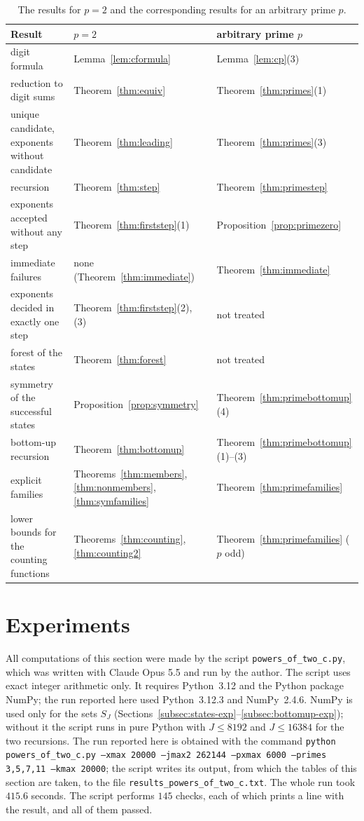 \documentclass[11pt]{amsart}
\theoremstyle{definition}
\begin{document}
\begin{table}[H]
\centering
\caption{The results for $p=2$ and the corresponding results for an arbitrary prime $p$.}
\label{tab:scope}
\begin{tabular}{lll}
\toprule
Result & $p=2$ & arbitrary prime $p$\\
\midrule
digit formula & Lemma~\ref{lem:cformula} & Lemma~\ref{lem:cp}(3)\\
reduction to digit sums & Theorem~\ref{thm:equiv} & Theorem~\ref{thm:primes}(1)\\
unique candidate, exponents without candidate & Theorem~\ref{thm:leading} & Theorem~\ref{thm:primes}(3)\\
recursion & Theorem~\ref{thm:step} & Theorem~\ref{thm:primestep}\\
exponents accepted without any step & Theorem~\ref{thm:firststep}(1) & Proposition~\ref{prop:primezero}\\
immediate failures & none (Theorem~\ref{thm:immediate}) & Theorem~\ref{thm:immediate}\\
exponents decided in exactly one step & Theorem~\ref{thm:firststep}(2), (3) & not treated\\
forest of the states & Theorem~\ref{thm:forest} & not treated\\
symmetry of the successful states & Proposition~\ref{prop:symmetry} & Theorem~\ref{thm:primebottomup}(4)\\
bottom-up recursion & Theorem~\ref{thm:bottomup} & Theorem~\ref{thm:primebottomup}(1)--(3)\\
explicit families & Theorems~\ref{thm:members}, \ref{thm:nonmembers}, \ref{thm:symfamilies} & Theorem~\ref{thm:primefamilies}\\
lower bounds for the counting functions & Theorems~\ref{thm:counting}, \ref{thm:counting2} & Theorem~\ref{thm:primefamilies} ($p$ odd)\\
\bottomrule
\end{tabular}
\end{table}

\section{Experiments}
\label{sec:experiments}
All computations of this section were made by the script \texttt{powers\_of\_two\_c.py}, which was written with Claude Opus 5.5 and run by the author. The script uses exact integer arithmetic only. It requires Python~3.12 and the Python package NumPy; the run reported here used Python~3.12.3 and NumPy~2.4.6. NumPy is used only for the sets $S_J$ (Sections~\ref{subsec:states-exp}--\ref{subsec:bottomup-exp}); without it the script runs in pure Python with $J\le8192$ and $J\le16384$ for the two recursions. The run reported here is obtained with the command \texttt{python powers\_of\_two\_c.py --xmax 20000 --jmax2 262144 --pxmax 6000 --primes 3,5,7,11 --kmax 20000}; the script writes its output, from which the tables of this section are taken, to the file \texttt{results\_powers\_of\_two\_c.txt}. The whole run took $415.6$ seconds. The script performs $145$ checks, each of which prints a line with the result, and all of them passed.
\end{document}
